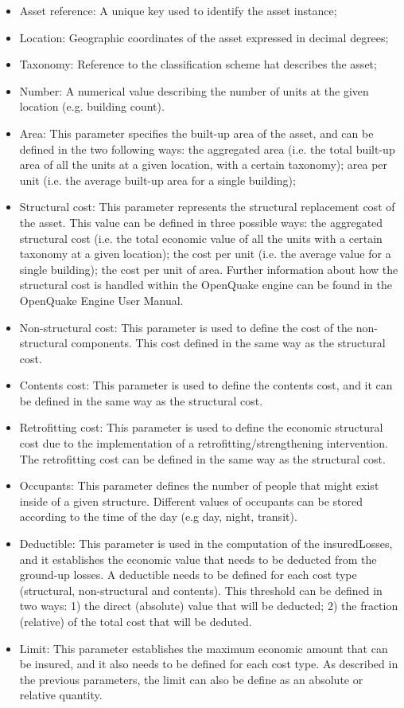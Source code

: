\begin{itemize}
\item Asset reference: A unique key used to identify the \gls{asset} instance;
\item Location: Geographic coordinates of the \gls{asset} expressed in decimal degrees;
\item Taxonomy: Reference to the classification scheme hat describes the \gls{asset};
\item Number: A numerical value describing the number of units at the given location (e.g. building count).
\item Area: This parameter specifies the built-up area of the asset, and can be defined in the two following ways: the aggregated area (i.e. the total built-up area of all the units at a given location, with a certain \gls{taxonomy}); area per unit (i.e. the average built-up area for a single building);
\item Structural cost: This parameter represents the structural replacement cost of the \gls{asset}. This value can be defined in three possible ways: the aggregated structural cost (i.e. the total economic value of all the units with a certain \gls{taxonomy} at a given location); the cost per unit (i.e. the average value for a single building); the cost per unit of area. Further information about how the structural cost is handled within the OpenQuake engine can be found in the OpenQuake Engine User Manual.
\item Non-structural cost: This parameter is used to define the cost of the non-structural components. This cost defined in the same way as the structural cost.
\item Contents cost: This parameter is used to define the contents cost, and it can be defined in the same way as the structural cost.
\item Retrofitting cost: This parameter is used to define the economic structural cost due to the implementation of a retrofitting/strengthening intervention. The retrofitting cost can be defined in the same way as the structural cost.
\item Occupants: This parameter defines the number of people that might exist inside of a given structure. Different values of occupants can be stored according to the time of the day (e.g day, night, transit).  
\item Deductible: This parameter is used in the computation of the \gls{insuredLosses}, and it establishes the economic value that needs to be deducted from the ground-up losses. A deductible needs to be defined for each cost type (structural, non-structural and contents). This threshold can be defined in two ways: 1) the direct (absolute) value that will be deducted; 2) the fraction (relative) of the total cost that will be deduted. 
\item Limit: This parameter establishes the maximum economic amount that can be insured, and it also needs to be defined for each cost type. As described in the previous parameters, the limit can also be define as an absolute or relative quantity.  
\end{itemize}


